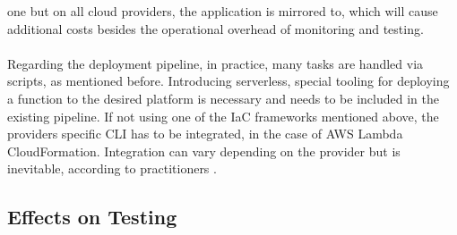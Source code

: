 \documentclass[a4paper,twoside,11pt, pagesize]{scrartcl}
\begin{document}
\begin{spacing}{1.2}
one but on all cloud providers, the application is mirrored to, which will cause additional costs besides the operational overhead of monitoring and testing.\\\\ Regarding the deployment pipeline, in practice, many tasks are handled via scripts, as mentioned before. Introducing serverless, special tooling for deploying a function to the desired platform is necessary and needs to be included in the existing pipeline. If not using one of the IaC frameworks mentioned above, the providers specific CLI has to be integrated, in the case of AWS Lambda CloudFormation. Integration can vary depending on the provider but is inevitable, according to practitioners \cite{ivanov2018implementation}.
\subsection{Effects on Testing}

\end{spacing}
\end{document}
